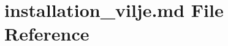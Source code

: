 \hypertarget{installation__vilje_8md}{}\section{installation\+\_\+vilje.\+md File Reference}
\label{installation__vilje_8md}
